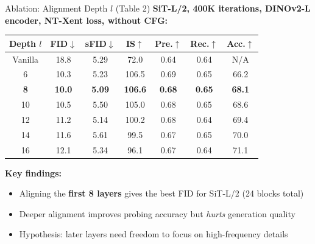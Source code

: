 \documentclass[aspectratio=169, 10pt]{beamer}
\begin{document}
\begin{frame}{Ablation: Alignment Depth $l$ (Table 2)}
\small
\textbf{SiT-L/2, 400K iterations, DINOv2-L encoder, NT-Xent loss, without CFG:}

\vspace{0.3em}
\begin{center}
\begin{tabular}{ccccccc}
\toprule
\textbf{Depth} $l$ & \textbf{FID$\downarrow$} & \textbf{sFID$\downarrow$} & \textbf{IS$\uparrow$} & \textbf{Pre.$\uparrow$} & \textbf{Rec.$\uparrow$} & \textbf{Acc.$\uparrow$} \\
\midrule
Vanilla & 18.8 & 5.29 & 72.0 & 0.64 & 0.64 & N/A \\
6  & 10.3 & 5.23 & 106.5 & 0.69 & 0.65 & 66.2 \\
\textbf{8}  & \textbf{10.0} & \textbf{5.09} & \textbf{106.6} & \textbf{0.68} & \textbf{0.65} & \textbf{68.1} \\
10 & 10.5 & 5.50 & 105.0 & 0.68 & 0.65 & 68.6 \\
12 & 11.2 & 5.14 & 100.2 & 0.68 & 0.64 & 69.4 \\
14 & 11.6 & 5.61 &  99.5 & 0.67 & 0.65 & 70.0 \\
16 & 12.1 & 5.34 &  96.1 & 0.67 & 0.64 & 71.1 \\
\bottomrule
\end{tabular}
\end{center}

\vspace{0.4em}
\textbf{Key findings:}
\begin{itemize}\setlength{\itemsep}{2pt}
  \item Aligning the \textbf{first 8 layers} gives the best FID for SiT-L/2 (24 blocks total)
  \item Deeper alignment improves probing accuracy but \emph{hurts} generation quality
  \item Hypothesis: later layers need freedom to focus on high-frequency details
\end{itemize}
\end{frame}
\end{document}

